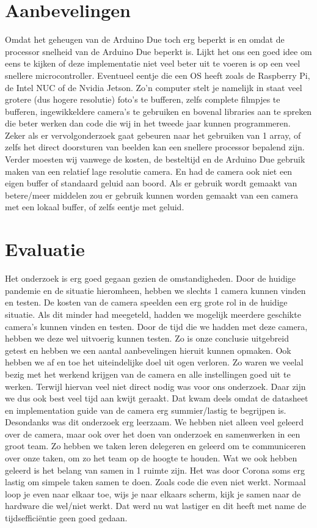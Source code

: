 \documentclass{article}
\begin{document}
\section{Aanbevelingen}
Omdat het geheugen van de Arduino Due toch erg beperkt is en omdat de processor snelheid van de Arduino Due beperkt is. Lijkt het ons een goed idee om eens te kijken of deze implementatie niet veel beter uit te voeren is op een veel snellere microcontroller. Eventueel eentje die een OS heeft zoals de Raspberry Pi, de Intel NUC of de Nvidia Jetson. Zo’n computer stelt je namelijk in staat veel grotere (dus hogere resolutie) foto’s te bufferen, zelfs complete filmpjes te bufferen, ingewikkeldere camera’s te gebruiken en bovenal libraries aan te spreken die beter werken dan code die wij in het tweede jaar kunnen programmeren. Zeker als er vervolgonderzoek gaat gebeuren naar het gebruiken van 1 array, of zelfs het direct doorsturen van beelden kan een snellere processor bepalend zijn.
Verder moesten wij vanwege de kosten, de besteltijd en de Arduino Due gebruik maken van een relatief lage resolutie camera. En had de camera ook niet een eigen buffer of standaard geluid aan boord. Als er gebruik wordt gemaakt van betere/meer middelen zou er gebruik kunnen worden gemaakt van een camera met een lokaal buffer, of zelfs eentje met geluid. 


\section{Evaluatie}
Het onderzoek is erg goed gegaan gezien de omstandigheden. Door de huidige pandemie en de situatie hieromheen, hebben we slechts 1 camera kunnen vinden en testen.
De kosten van de camera speelden een erg grote rol in de huidige situatie. Als dit minder had meegeteld, hadden we mogelijk meerdere geschikte camera’s kunnen vinden en testen.
Door de tijd die we hadden met deze camera, hebben we deze wel uitvoerig kunnen testen. 
Zo is onze conclusie uitgebreid getest en hebben we een aantal aanbevelingen hieruit kunnen opmaken. 
Ook hebben we af en toe het uiteindelijke doel uit ogen verloren. Zo waren we veelal bezig met het werkend krijgen van de camera en alle instellingen goed uit te werken. Terwijl hiervan veel niet direct nodig was voor ons onderzoek. Daar zijn we dus ook best veel tijd aan kwijt geraakt. Dat kwam deels omdat de datasheet en implementation guide van de camera erg summier/lastig te begrijpen is.
Desondanks was dit onderzoek erg leerzaam. We hebben niet alleen veel geleerd over de camera, maar ook over het doen van onderzoek en samenwerken in een groot team. Zo hebben we taken leren delegeren en geleerd om te communiceren over onze taken, om zo het team op de hoogte te houden. 
Wat we ook hebben geleerd is het belang van samen in 1 ruimte zijn. Het was door Corona soms erg lastig om simpele taken samen te doen. Zoals code die even niet werkt. Normaal loop je even naar elkaar toe, wijs je naar elkaars scherm, kijk je samen naar de hardware die wel/niet werkt. Dat werd nu wat lastiger en dit heeft met name de tijdsefficiëntie geen goed gedaan.
\end{document}

